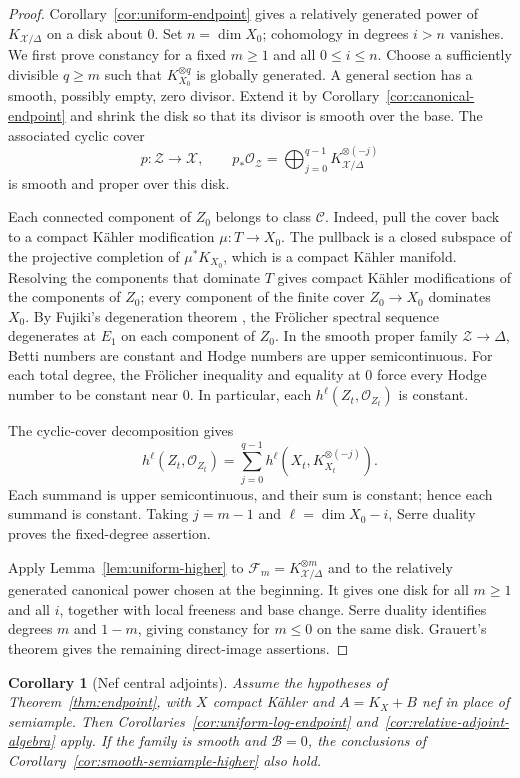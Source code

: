 \documentclass[11pt,a4paper]{article}
\numberwithin{equation}{section}
\newtheorem{corollary}[theorem]{Corollary}
\theoremstyle{definition}
\theoremstyle{remark}
\newcommand{\OO}{\mathcal O}\newcommand{\cX}{\mathcal X}
\begin{document}
\begin{proof}
Corollary~\ref{cor:uniform-endpoint} gives a relatively generated
power of $K_{\mathcal X/\Delta}$ on a disk about $0$.
Set $n=\dim X_0$; cohomology in degrees $i>n$ vanishes.
We first prove constancy for a fixed $m\ge1$ and all $0\le i\le n$.
Choose a sufficiently divisible $q\ge m$
such that $K_{X_0}^{\otimes q}$ is globally generated. A general
section has a smooth, possibly empty, zero divisor. Extend it by
Corollary~\ref{cor:canonical-endpoint} and shrink the disk so that
its divisor is smooth over the base. The associated cyclic cover
\[
 p:\mathcal Z\longrightarrow\mathcal X,\qquad
 p_*\OO_{\mathcal Z}
 =\bigoplus_{j=0}^{q-1}K_{\mathcal X/\Delta}^{\otimes(-j)}
\]
is smooth and proper over this disk.

Each connected component of $Z_0$ belongs to class $\mathcal C$.
Indeed, pull the cover back to a compact Kähler modification
$\mu:T\to X_0$. The pullback is a closed subspace of the projective
completion of $\mu^*K_{X_0}$, which is a compact Kähler manifold.
Resolving the components that dominate $T$ gives compact Kähler
modifications of the components of $Z_0$; every component of the
finite cover $Z_0\to X_0$ dominates $X_0$.
By Fujiki's degeneration theorem \cite[Proposition~1.6]{Fujiki1978},
the Fr\"olicher spectral sequence degenerates at $E_1$ on each
component of $Z_0$. In the smooth proper family
$\mathcal Z\to\Delta$, Betti numbers are constant and Hodge numbers
are upper semicontinuous. For each total degree, the Fr\"olicher
inequality and equality at $0$ force every Hodge number to be
constant near $0$. In particular, each $h^\ell(Z_t,\OO_{Z_t})$
is constant.

The cyclic-cover decomposition gives
\[
 h^\ell(Z_t,\OO_{Z_t})
 =\sum_{j=0}^{q-1}h^\ell(X_t,K_{X_t}^{\otimes(-j)}).
\]
Each summand is upper semicontinuous, and their sum is constant;
hence each summand is constant. Taking $j=m-1$ and
$\ell=\dim X_0-i$, Serre duality proves the fixed-degree assertion.

Apply Lemma~\ref{lem:uniform-higher} to
$\mathcal F_m=K_{\mathcal X/\Delta}^{\otimes m}$ and to the
relatively generated canonical power chosen at the beginning.
It gives one disk for all $m\ge1$ and all $i$, together with local
freeness and base change. Serre duality identifies degrees $m$
and $1-m$, giving constancy for $m\le0$ on the same disk.
Grauert's theorem gives the remaining direct-image assertions.
\end{proof}

\begin{corollary}[Nef central adjoints]\label{cor:nef-central-adjoint}
Assume the hypotheses of Theorem~\ref{thm:endpoint}, with $X$ compact
Kähler and $A=K_X+B$ nef in place of semiample.
Then Corollaries~\ref{cor:uniform-log-endpoint}
and~\ref{cor:relative-adjoint-algebra} apply.
If the family is smooth and $\mathcal B=0$, the conclusions of
Corollary~\ref{cor:smooth-semiample-higher} also hold.
\end{corollary}
\end{document}
